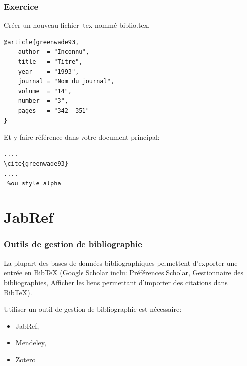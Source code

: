 \documentclass{beamer}
\begin{document}

\begin{frame}[fragile]
\frametitle{Exercice}

Créer un nouveau fichier .tex nommé biblio.tex. 

\begin{lstlisting}
@article{greenwade93,
    author  = "Inconnu",
    title   = "Titre",
    year    = "1993",
    journal = "Nom du journal",
    volume  = "14",
    number  = "3",
    pages   = "342--351"
}
\end{lstlisting}

Et y faire référence dans votre document principal:

\begin{lstlisting}
....
\cite{greenwade93}
....
 %ou style alpha

\end{lstlisting}

\end{frame}



\section{JabRef}


\begin{frame}
\frametitle{Outils de gestion de bibliographie}

La plupart des bases de données bibliographiques permettent d'exporter une entrée en BibTeX (Google Scholar inclu: Préférences Scholar,  Gestionnaire des bibliographies,  Afficher les liens permettant d'importer des citations dans BibTeX).

Utiliser un outil de gestion de bibliographie est nécessaire:
\begin{itemize}
\item JabRef,
\item Mendeley,
\item Zotero
\end{itemize}
\end{frame}

\end{document}
